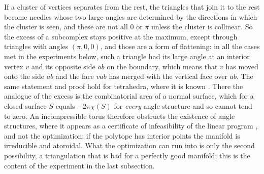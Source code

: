 \documentclass[11pt]{amsart}
\theoremstyle{definition}
\theoremstyle{remark}
\begin{document}
If a cluster of vertices separates from the rest, the triangles that join it to the rest become needles whose two large angles are determined by the directions in which the cluster is seen, and these are not all $0$ or $\pi$ unless the cluster is collinear. So the excess of a subcomplex stays positive at the maximum, except through triangles with angles $(\pi,0,0)$, and those are a form of flattening:
in all the cases met in the experiments below, such a triangle had its large angle at an interior vertex $v$ and its opposite side $ab$ on the boundary, which means that $v$ has moved onto the side $ab$ and the face $vab$ has merged with the vertical face over $ab$.
The same statement and proof hold for tetrahedra, where it is known \cite{FG11}. There the analogue of the excess is the combinatorial area of a normal surface, which for a closed surface $S$ equals $-2\pi\chi(S)$ for \emph{every} angle structure and so cannot tend to zero.
An incompressible torus therefore obstructs the existence of angle structures, where it appears as a certificate of infeasibility of the linear program \cite{Riv03,LT08}, and not the optimization: if the polytope has interior points the manifold is irreducible and atoroidal.
What the optimization can run into is only the second possibility, a triangulation that is bad for a perfectly good manifold; this is the content of the experiment in the last subsection.
\end{document}
